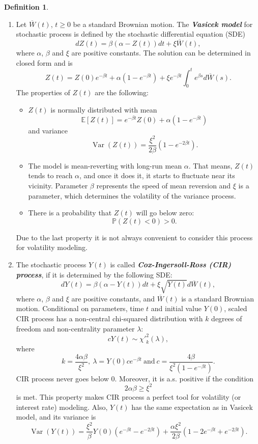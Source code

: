 \documentclass[a4paper,11pt]{book}
\theoremstyle{plain}
\theoremstyle{definition}
\newtheorem{defn}[thm]{Definition}
\newcommand{\ME}{\mathbb{E}}
\newcommand{\MP}{\mathbb{P}}
\newcommand{\Var}{\operatorname{Var}}
\newcommand{\define}[1]{\textit{\textbf{#1}}}
\begin{document}
    \begin{defn} \
    	\begin{enumerate}
    		\item 
    		Let $\overline{W}(t)$, $t \geq 0$ be a standard Brownian motion. The \define{Vasicek model} for stochastic process is defined by the stochastic differential equation (SDE)
    		\begin{equation} \label{Vasicek}
    		dZ(t) = \beta(\alpha - Z(t))dt + \xi \overline{W}(t),
    		\end{equation}
    		where $\alpha$, $\beta$ and $\xi$ are positive constants. The solution can be determined in closed form and is
    		\[ Z(t) = Z(0) e^{-\beta t} + \alpha (1 - e^{-\beta t}) + \xi e^{-\beta t} \int_{0}^{t} e^{\beta s}d\overline{W}(s).\]
    		The properties of $Z(t)$ are the following:
    		\begin{itemize}
    			\item $Z(t)$ is normally distributed with mean
    			\[ \ME[Z(t)] = e^{-\beta t} Z(0) + \alpha(1-e^{-\beta t}) \]
    			and variance
    			\[ \Var(Z(t)) = \frac{\xi^2}{2\beta} (1-e^{-2\beta t}). \]
    			\item The model is mean-reverting with long-run mean $\alpha$. That means, $Z(t)$ tends to reach $\alpha$, and once it does it, it starts to fluctuate near its vicinity. Parameter $\beta$ represents the speed of mean reversion and $\xi$ is a parameter, which determines the volatility of the variance process.
    			\item There is a probability that $Z(t)$ will go below zero:
    			\[ \MP(Z(t) < 0) > 0. \]
    		\end{itemize}
    		Due to the last property it is not always convenient to consider this process for volatility modeling.
    		\item
    		The stochastic process $Y(t)$ is called \define{Cox-Ingersoll-Ross (CIR) process}, if it is determined by the following SDE:
    		\begin{equation} \label{CIR}
    		dY(t) = \beta(\alpha - Y(t))dt + \xi\sqrt{Y(t)}d \overline{W}(t),
    		\end{equation}
    		where $\alpha$, $\beta$ and $\xi$ are positive constants, and $\overline{W}(t)$ is a standard Brownian motion. Conditional on parameters, time $t$ and initial value $Y(0)$, scaled CIR process has a non-central chi-squared distribution with $k$ degrees of freedom and non-centrality parameter $\lambda$:
    		\[ c Y(t) \sim {\chi'}_k^2(\lambda),  \]
    		where
    		\[k = \frac{4\alpha \beta}{\xi^2},\ \lambda = Y(0) c e^{-\beta t} \ \text{and} \ c = \frac{4 \beta}{\xi^2 (1-e^{-\beta t})}.\]
    		CIR process never goes below $0$. Moreover, it is a.s. positive if the condition
    		\[ 2\alpha \beta \geq \xi^2  \]
    		is met. This property makes CIR process a perfect tool for volatility (or interest rate) modeling. Also, $Y(t)$ has the same expectation as in Vasicek model, and its variance is
    		\[ \Var(Y(t)) = \frac{\xi^2}{\beta} Y(0) (e^{-\beta t} - e^{-2\beta t}) + \frac{\alpha \xi^2}{2\beta}(1-2e^{-\beta t} + e^{-2\beta t}). \]
    		

\end{enumerate}
\end{defn}
\end{document}
